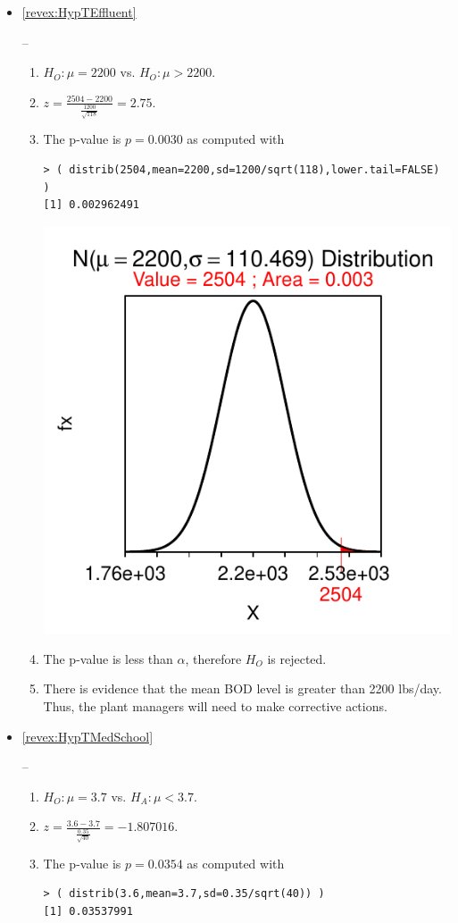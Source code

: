 \documentclass[10pt,openany]{book}\usepackage[]{graphicx}\usepackage[]{color}
\makeatletter
\newenvironment{kframe}{%
 \def\at@end@of@kframe{}%
 \ifinner\ifhmode%
  \def\at@end@of@kframe{\end{minipage}}%
  \begin{minipage}{\columnwidth}%
 \fi\fi%
 \def\FrameCommand##1{\hskip\@totalleftmargin \hskip-\fboxsep
 \colorbox{shadecolor}{##1}\hskip-\fboxsep
     \hskip-\linewidth \hskip-\@totalleftmargin \hskip\columnwidth}%
 \MakeFramed {\advance\hsize-\width
   \@totalleftmargin\z@ \linewidth\hsize
   \@setminipage}}%
 {\par\unskip\endMakeFramed%
 \at@end@of@kframe}
\newenvironment{knitrout}{}{} %
\makeatother
\begin{document}
\begin{itemize}
  \item \hypertarget{ans:HypTEffluent}{\ref{revex:HypTEffluent}} --
    \begin{enumerate}
      \item $H_{O}:\mu=2200$ vs. $H_{O}:\mu>2200$.
      \item $z=\frac{2504-2200}{\frac{1200}{\sqrt{118}}}=2.75$.
      \item The p-value is $p=0.0030$ as computed with
\begin{knitrout}
\color{fgcolor}\begin{kframe}
\begin{verbatim}
> ( distrib(2504,mean=2200,sd=1200/sqrt(118),lower.tail=FALSE) )
[1] 0.002962491
\end{verbatim}
\end{kframe}

{\centering \includegraphics[width=.4\linewidth]{Figs/unnamed-chunk-325-1} 

}



\end{knitrout}
      \item The p-value is less than $\alpha$, therefore $H_{O}$ is rejected.
      \item There is evidence that the mean BOD level is greater than 2200 lbs/day.  Thus, the plant managers will need to make corrective actions.
    \end{enumerate}

  \item \hypertarget{ans:HypTMedSchool}{\ref{revex:HypTMedSchool}} --
    \begin{enumerate}
      \item $H_{O}:\mu=3.7$ vs. $H_{A}:\mu<3.7$.
      \item $z=\frac{3.6-3.7}{\frac{0.35}{\sqrt{40}}}=-1.807016$.
      \item The p-value is $p=0.0354$ as computed with
\begin{knitrout}
\color{fgcolor}\begin{kframe}
\begin{verbatim}
> ( distrib(3.6,mean=3.7,sd=0.35/sqrt(40)) )
[1] 0.03537991
\end{verbatim}
\end{kframe}


\end{knitrout}
\end{enumerate}
\end{itemize}
\end{document}

